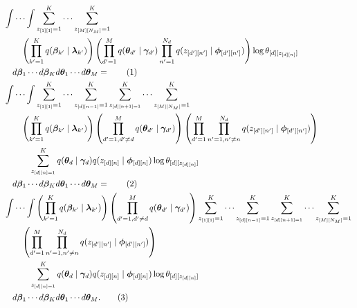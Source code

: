 \documentclass[12pt]{article}
\newcommand\numberthis{\addtocounter{equation}{1}\tag{\theequation}}
\begin{document}
\begin{align*}
    &\int \cdots \int
    \sum_{z_{[1][1]}=1}^{K} \cdots \sum_{z_{[M][N_{M}]}=1}^{K} \\*
    &\quad\quad\left(\prod_{k'=1}^{K} q(\bm{\beta}_{k'} \mid
    \bm{\lambda}_{k'})\right) \left(\prod_{d'=1}^{M}q(\bm{\theta}_{d'} \mid \bm{\gamma}_{d'})
    \prod_{n'=1}^{N_{d}}q(z_{[d'][n']} \mid \bm{\phi}_{[d'][n']})\right)
    \log \theta_{[d][z_{[d][n]}]}\\*
    &\quad d\bm{\beta}_{1}\cdots d\bm{\beta}_{K}d\bm{\theta}_{1}\cdots
    d\bm{\theta}_{M} = \numberthis \\
    &\int \cdots \int
    \sum_{z_{[1][1]}=1}^{K} \cdots \sum_{z_{[d][n-1]}=1}^{K}
    \sum_{z_{[d][n+1]=1}}^{K} \cdots \sum_{z_{[M][N_{M}]}=1}^{K} \\*
    &\quad\quad\left(\prod_{k'=1}^{K} q(\bm{\beta}_{k'} \mid
    \bm{\lambda}_{k'})\right)
    \left(\prod_{d'=1, d'\neq d}^{M}q(\bm{\theta}_{d'} \mid \bm{\gamma}_{d'})\right)
    \left(\prod_{d'=1}^{M}\prod_{n'=1, n'\neq n}^{N_{d}}q(z_{[d'][n']} \mid
    \bm{\phi}_{[d'][n']})\right) \\*
    &\quad\quad\quad\sum_{z_{[d][n]=1}}^{K} q(\bm{\theta}_{d} \mid \bm{\gamma}_{d}) q(z_{[d][n]}
    \mid \bm{\phi}_{[d][n]})\log \theta_{[d][z_{[d][n]}]}\\*
    &\quad d\bm{\beta}_{1}\cdots d\bm{\beta}_{K}d\bm{\theta}_{1}\cdots
    d\bm{\theta}_{M} = \numberthis \\
    &\int \cdots \int \left(\prod_{k'=1}^{K} q(\bm{\beta}_{k'} \mid
    \bm{\lambda}_{k'})\right)
    \left(\prod_{d'=1, d'\neq d}^{M}q(\bm{\theta}_{d'} \mid \bm{\gamma}_{d'})\right)
    \sum_{z_{[1][1]}=1}^{K} \cdots \sum_{z_{[d][n-1]}=1}^{K}
    \sum_{z_{[d][n+1]=1}}^{K} \cdots \sum_{z_{[M][N_{M}]}=1}^{K} \\*
    &\quad\quad \left(\prod_{d'=1}^{M}\prod_{n'=1, n'\neq n}^{N_{d}}
    q(z_{[d'][n']} \mid
    \bm{\phi}_{[d'][n']})\right) \\*
    &\quad\quad\quad\sum_{z_{[d][n]=1}}^{K} q(\bm{\theta}_{d} \mid \bm{\gamma}_{d}) q(z_{[d][n]}
    \mid \bm{\phi}_{[d][n]})\log \theta_{[d][z_{[d][n]}]}\\*
    &\quad d\bm{\beta}_{1}\cdots d\bm{\beta}_{K}d\bm{\theta}_{1}\cdots
    d\bm{\theta}_{M}.
    \numberthis
\end{align*}
\end{document}
